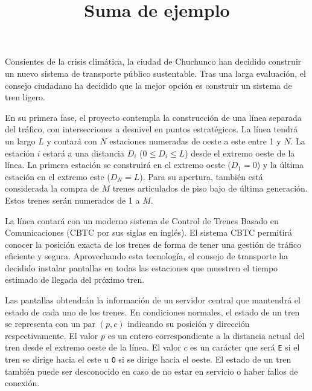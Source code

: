 \documentclass{oci}
\title{Suma de ejemplo}
\begin{document}
\begin{problemDescription}
  Consientes de la crisis climática, la ciudad de Chuchunco
  han decidido construir un nuevo sistema de transporte
  público sustentable.
  Tras una larga evaluación, el consejo ciudadano
  ha decidido que la mejor opción es construir un
  sistema de tren ligero.

  En su primera fase, el proyecto contempla la
  construcción de una línea separada del tráfico, con
  intersecciones a desnivel en puntos estratégicos.
  La línea tendrá un largo $L$ y contará con $N$
  estaciones numeradas de oeste a este entre 1 y $N$.
  La estación $i$ estará a una distancia $D_i$
  ($0 \leq D_i \leq L$) desde el extremo oeste
  de la línea.
  La primera estación se construirá en el extremo
  oeste ($D_1 = 0$) y la última estación
  en el extremo este ($D_N = L$).
  Para su apertura, también está considerada la
  compra de $M$ trenes articulados de piso bajo
  de última generación.
  Estos trenes serán numerados de 1 a $M$.

  La línea contará con un moderno sistema de
  Control de Trenes Basado en Comunicaciones
  (CBTC por sus siglas en inglés).
  El sistema CBTC permitirá conocer la posición
  exacta de los trenes de forma de tener una
  gestión de tráfico eficiente y segura.
  Aprovechando esta tecnología, el consejo de
  transporte ha decidido instalar pantallas en todas las
  estaciones que muestren el tiempo estimado de
  llegada del próximo tren.

  Las pantallas obtendrán la información de un
  servidor central que mantendrá el estado
  de cada uno de los trenes.
  En condiciones normales, el estado de un tren
  se representa con un par $(p, c)$ indicando
  su posición y dirección respectivamente.
  El valor $p$ es un entero correspondiente a la
  distancia actual del tren desde el extremo oeste
  de la línea.
  El valor $c$ es un carácter que será \texttt{E}
  si el tren se dirige hacia el este u \texttt{O}
  si se dirige hacia el oeste.
  El estado de un tren también puede ser desconocido
  en caso de no estar en servicio o haber fallos
  de conexión.


\end{problemDescription}
\end{document}

